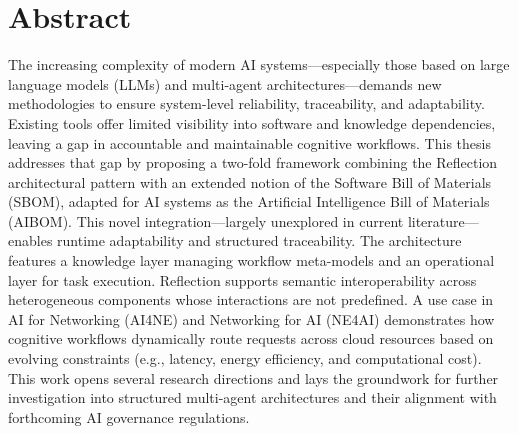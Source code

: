 \chapter{Abstract}\label{ch:introduzione}
The increasing complexity of modern AI systems—especially those based on large language models (LLMs) and multi-agent architectures—demands new methodologies to ensure system-level reliability, traceability, and adaptability. Existing tools offer limited visibility into software and knowledge dependencies, leaving a gap in accountable and maintainable cognitive workflows. This thesis addresses that gap by proposing a two-fold framework combining the Reflection architectural pattern with an extended notion of the Software Bill of Materials (SBOM), adapted for AI systems as the Artificial Intelligence Bill of Materials (AIBOM). This novel integration—largely unexplored in current literature—enables runtime adaptability and structured traceability. The architecture features a knowledge layer managing workflow meta-models and an operational layer for task execution. Reflection supports semantic interoperability across heterogeneous components whose interactions are not predefined. A use case in AI for Networking (AI4NE) and Networking for AI (NE4AI) demonstrates how cognitive workflows dynamically route requests across cloud resources based on evolving constraints (e.g., latency, energy efficiency, and computational cost). This work opens several research directions and lays the groundwork for further investigation into structured multi-agent architectures and their alignment with forthcoming AI governance regulations.

